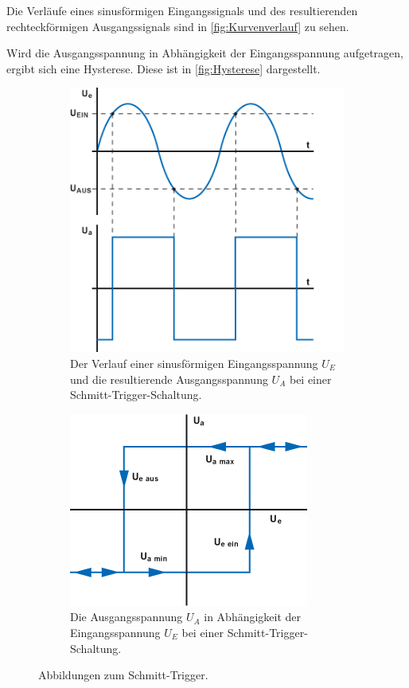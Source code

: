 Die Verläufe eines sinusförmigen Eingangssignals und des resultierenden rechteckförmigen Ausgangssignals sind in \autoref{fig:Kurvenverlauf} zu sehen.

Wird die Ausgangsspannung in Abhängigkeit der Eingangsspannung aufgetragen, ergibt sich eine Hysterese. Diese ist in \autoref{fig:Hysterese} dargestellt. %

\begin{figure}
    \centering
    \begin{subfigure}{0.48\textwidth}
        \centering
        \includegraphics[width=0.75\linewidth]{./figures/Kurvenverlauf.png}
        \caption{Der Verlauf einer sinusförmigen Eingangsspannung $U_E$ und die resultierende Ausgangsspannung $U_A$ bei einer Schmitt-Trigger-Schaltung.} %
        \label{fig:Kurvenverlauf}
    \end{subfigure}
    \begin{subfigure}{0.48\textwidth}
        \centering
        \includegraphics[width=0.8\linewidth]{./figures/Hysterese.png}
        \caption{Die Ausgangsspannung $U_A$ in Abhängigkeit der Eingangsspannung $U_E$ bei einer Schmitt-Trigger-Schaltung.} %
        \label{fig:Hysterese}
    \end{subfigure}
    \caption{Abbildungen zum Schmitt-Trigger.}
    \label{fig:Abbildung}
\end{figure}

